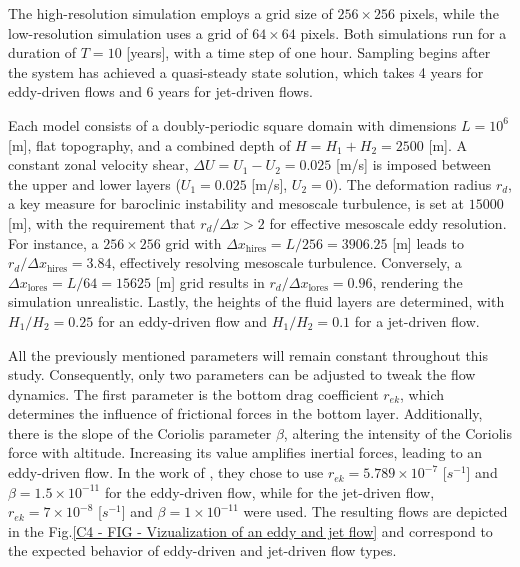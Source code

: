 The high-resolution simulation employs a grid size of $256 \times 256$ pixels, while the low-resolution simulation uses a grid of $64 \times 64$ pixels. Both simulations run for a duration of $T = 10$ [years], with a time step of one hour. Sampling begins after the system has achieved a quasi-steady state solution, which takes 4 years for eddy-driven flows and 6 years for jet-driven flows.\\

\vspace{-1.5em}
\vspace{-0.2em}

Each model consists of a doubly-periodic square domain with dimensions $L = 10^6$ [m], flat topography, and a combined depth of $H = H_1 + H_2 = 2500$ [m]. A constant zonal velocity shear, $\Delta U = U_1 - U_2 = 0.025$ [m/s] is imposed between the upper and lower layers ($U_1 = 0.025$ [m/s], $U_2 = 0$). The deformation radius $r_d$, a key measure for baroclinic instability and mesoscale turbulence, is set at $15000$ [m], with the requirement that $r_d / \Delta x > 2$ for effective mesoscale eddy resolution. For instance, a $256 \times 256$ grid with $\Delta x_{\text {hires}} = L / 256 = 3906.25$ [m] leads to $r_d / \Delta x_{\text {hires}} = 3.84$, effectively resolving mesoscale turbulence. Conversely, a $\Delta x_{\text {lores}} = L / 64 = 15625$ [m] grid results in $r_d / \Delta x_{\text {lores}} = 0.96$, rendering the simulation unrealistic. Lastly, the heights of the fluid layers are determined, with $H_1 / H_2 = 0.25$ for an eddy-driven flow and $H_1 / H_2 = 0.1$ for a jet-driven flow.


All the previously mentioned parameters will remain constant throughout this study. Consequently, only two parameters can be adjusted to tweak the flow dynamics. The first parameter is the bottom drag coefficient $r_{e k}$, which determines the influence of frictional forces in the bottom layer. Additionally, there is the slope of the Coriolis parameter $\beta$, altering the intensity of the Coriolis force with altitude. Increasing its value amplifies inertial forces, leading to an eddy-driven flow. In the work of \cite{Benchmarking}, they chose to use $r_{e k} = 5.789 \times 10^{-7}$ [$s^{-1}$]  and $\beta = 1.5 \times 10^{-11}$ for the eddy-driven flow, while for the jet-driven flow, $r_{e k} = 7 \times 10^{-8}$  [$s^{-1}$] and $\beta = 1 \times 10^{-11}$ were used. The resulting flows are depicted in the Fig.\ref{C4 - FIG - Vizualization of an eddy and jet flow} and correspond to the expected behavior of eddy-driven and jet-driven flow types.

